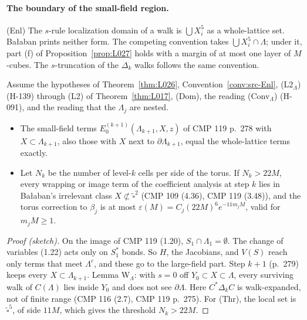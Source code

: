 \paragraph{The boundary of the small-field region.}
\begin{convention}\label{conv:src-Enl}
(Enl) The $s$-rule localization domain of a walk is $\bigcup X_i^5$ as a whole-lattice set. Ba{\l}aban prints neither form. The competing convention takes $\bigcup X_i^5\cap\Lambda$; under it, part (f) of Proposition~\ref{prop:L027} holds with a margin of at most one layer of $M$-cubes. The $s$-truncation of the $\Delta_k$ walks follows the same convention.
\end{convention}

\begin{proposition}\label{prop:L027}
Assume the hypotheses of Theorem~\ref{thm:L026}, Convention~\ref{conv:src-Enl}, (L2$_\Lambda$) (H-139) through (L2) of Theorem~\ref{thm:L017}, (Dom), the reading (Conv$_\Lambda$) (H-091), and the reading that the $\Lambda_j$ are nested.
\begin{itemize}
\item[(f)] The small-field terms $E_0^{(k+1)}(\Lambda_{k+1},X,z)$ of CMP 119 p.~278 with $X\subset\Lambda_{k+1}$, also those with $X$ next to $\partial\Lambda_{k+1}$, equal the whole-lattice terms exactly.
\item[(Thr)] Let $N_k$ be the number of level-$k$ cells per side of the torus. If $N_k>22M$, every wrapping or image term of the coefficient analysis at step $k$ lies in Ba{\l}aban's irrelevant class $X\not\subset\tilde\square^2$ (CMP 109 (4.36), CMP 119 (3.48)), and the torus correction to $\beta_j$ is at most $\varepsilon(M)=C_j(22M)^6e^{-11m_jM}$, valid for $m_jM\ge1$.
\end{itemize}
\end{proposition}
\begin{proof}[Proof (sketch)]
On the image of CMP 119 (1.20), $S_1\cap\Lambda_1=\emptyset$. The change of variables (1.22) acts only on $S_1^*$ bonds. So $H$, the Jacobians, and $V(S)$ reach only terms that meet $\Lambda^c$, and these go to the large-field part. Step $k+1$ (p.~279) keeps every $X\subset\Lambda_{k+1}$. Lemma W$_\Lambda$: with $s=0$ off $Y_0\subset X\subset\Lambda$, every surviving walk of $C(\Lambda)$ lies inside $Y_0$ and does not see $\partial\Lambda$. Here $C^*\Delta_kC$ is walk-expanded, not of finite range (CMP 116 (2.7), CMP 119 p.~275). For (Thr), the local set is $\tilde\square^5$, of side $11M$, which gives the threshold $N_k>22M$.
\end{proof}

